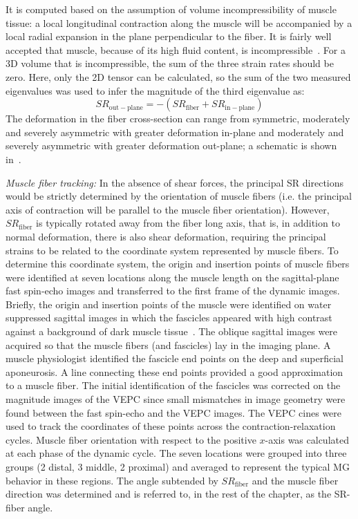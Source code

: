 It is computed based on the assumption of volume incompressibility of muscle tissue: a local longitudinal contraction along the muscle will be accompanied by a local radial expansion in the plane perpendicular to the fiber. 
It is fairly well accepted that muscle, because of its high fluid content, is incompressible~\cite{RNS22, RNS23}. 
For a 3D volume that is incompressible, the sum of the three strain rates should be zero. 
Here, only the 2D tensor can be calculated, so the sum of the two measured eigenvalues was used to infer the magnitude of the third eigenvalue as:
\begin{equation}\label{eq: SR through plane}
SR_{\mathrm{out-plane}} = - \left( SR_{\mathrm{fiber}} + SR_{\mathrm{in-plane}} \right)
\end{equation}
The deformation in the fiber cross-section can range from symmetric, moderately and severely asymmetric with greater deformation in-plane and moderately and severely asymmetric with greater deformation out-plane; a schematic is shown in~\cite{RNS16}. 

\textit{Muscle fiber tracking:}
In the absence of shear forces, the principal SR directions would be strictly determined by the orientation of muscle fibers (i.e. the principal axis of contraction will be parallel to the muscle fiber orientation). 
However, $SR_\mathrm{fiber}$ is typically rotated away from the fiber long axis, that is, in addition to normal deformation, there is also shear deformation, requiring the principal strains to be related to the coordinate system represented by muscle fibers. 
To determine this coordinate system, the origin and insertion points of muscle fibers were identified at seven locations along the muscle length on the sagittal-plane fast spin-echo images and transferred to the first frame of the dynamic images. 
Briefly, the origin and insertion points of the muscle were identified on water suppressed sagittal images in which the fascicles appeared with high contrast against a background of dark muscle tissue~\cite{RNS24}. 
The oblique sagittal images were acquired so that the muscle fibers (and fascicles) lay in the imaging plane.  
A muscle physiologist identified the fascicle end points on the deep and superficial aponeurosis. 
A line connecting these end points provided a good approximation to a muscle fiber. 
The initial identification of the fascicles was corrected on the magnitude images of the VEPC since small mismatches in image geometry were found between the fast spin-echo and the VEPC images. 
The VEPC cines were used to track the coordinates of these points across the contraction-relaxation cycles. 
Muscle fiber orientation with respect to the positive $x$-axis was calculated at each phase of the dynamic cycle. 
The seven locations were grouped into three groups (2 distal, 3 middle, 2 proximal) and averaged to represent the typical MG behavior in these regions. 
The angle subtended by $SR_\mathrm{fiber}$ and the muscle fiber direction was determined and is referred to, in the rest of the chapter, as the SR-fiber angle.


